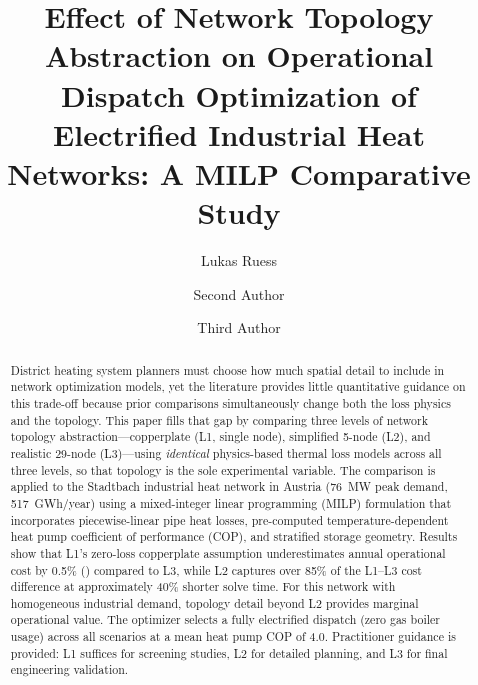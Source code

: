 \documentclass[a4paper,fleqn]{cas-dc}
\begin{document}
\let\WriteBookmarks\relax
\def\floatpagepagefraction{1}
\def\textpagefraction{.001}



\title[mode=title]{Effect of Network Topology Abstraction on Operational Dispatch Optimization of Electrified Industrial Heat Networks: A MILP Comparative Study}

\author[1]{Lukas Ruess}
\cormark[1]


\author[1]{Second Author}

\author[1]{Third Author}


\begin{abstract}
District heating system planners must choose how much spatial detail to include in network optimization models, yet the literature provides little quantitative guidance on this trade-off because prior comparisons simultaneously change both the loss physics and the topology.
This paper fills that gap by comparing three levels of network topology abstraction---copperplate (L1, single node), simplified 5-node (L2), and realistic 29-node (L3)---using \emph{identical} physics-based thermal loss models across all three levels, so that topology is the sole experimental variable.
The comparison is applied to the Stadtbach industrial heat network in Austria (\SI{76}{MW} peak demand, \SI{517}{GWh/year}) using a mixed-integer linear programming (MILP) formulation that incorporates piecewise-linear pipe heat losses, pre-computed temperature-dependent heat pump coefficient of performance (COP), and stratified storage geometry.
Results show that L1's zero-loss copperplate assumption underestimates annual operational cost by 0.5\% () compared to L3, while L2 captures over 85\% of the L1--L3 cost difference at approximately 40\% shorter solve time.
For this network with homogeneous industrial demand, topology detail beyond L2 provides marginal operational value.
The optimizer selects a fully electrified dispatch (zero gas boiler usage) across all scenarios at a mean heat pump COP of 4.0.
Practitioner guidance is provided: L1 suffices for screening studies, L2 for detailed planning, and L3 for final engineering validation.
\end{abstract}
\end{document}
